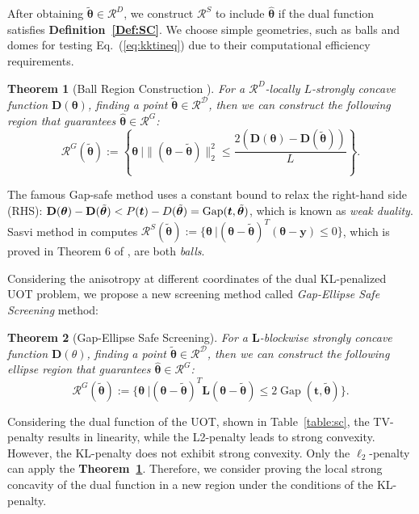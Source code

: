\documentclass[11pt]{article}
\newtheorem{thm}{Theorem}
\newcommand{\Gap}{\operatorname{Gap}}
\newcommand{\mat}[1]{\mathbf{#1}}
\renewcommand{\vec}[1]{\bm{#1}}
\begin{document}
After obtaining $\tilde{\vec{\theta}}\in\mathcal{R}^{D}$, we construct $\mathcal{R}^{S}$ to include $\hat{\vec{\theta}}$ if the dual function satisfies {\bf Definition~\ref{Def:SC}}. We choose simple geometries, such as balls and domes for testing Eq.~(\ref{eq:kktineq}) due to their computational efficiency requirements.
\label{Sec:SC}
\begin{thm}[Ball Region Construction \cite{Yamada_NIPS_2021}]
\label{Thm:Gap_all}
For a $\mathcal{R}^{D}$-locally $L$-strongly concave function $\mat D(\vec\theta)$, finding a point $\tilde{\vec\theta} \in \mathcal{R^{D}}$, then we can construct the following region that guarantees $\hat{\vec\theta} \in\mathcal{R}^{G}$:
\begin{equation}
\mathcal{R}^{G}(\tilde{\vec\theta}) :=\left\{\vec\theta \ |\|(\vec\theta-\tilde{\vec\theta})\|_2^2 \leq \frac{2(\mat D(\vec \theta) - \mat D(\tilde{\vec\theta}))}{ L} \right\}.
\label{eq:gs}
\end{equation}
\end{thm}
The famous Gap-safe method \cite{JMLR:v18:16-577} uses a constant bound to relax the right-hand side (RHS): $\mat D(\vec \theta) - \mat D(\tilde{\vec\theta}) < \mat \mat P({\vec t}) - D(\tilde{\vec \theta}) = \Gap(\vec t, \tilde{\vec \theta})$, which is known as {\it weak duality}. Sasvi method in \cite[Theorem 8]{Yamada_NIPS_2021} computes $\mathcal{R}^{S}(\tilde{\vec\theta}) :=\{\vec\theta \ | (\vec\theta-\tilde{\vec\theta})^{T}(\vec\theta-\vec y)\leq 0\}$, which is proved in Theorem 6 of \cite{Yamada_NIPS_2021}, are both {\it balls}.

Considering the anisotropy at different coordinates of the dual KL-penalized UOT problem, we propose a new screening method called {\it Gap-Ellipse Safe Screening} method:
\begin{thm}[Gap-Ellipse Safe Screening]
\label{Thm:Gap_ellipse}
For a $\mat L$-blockwise strongly concave function $\mat D(\theta)$, finding a point $\tilde{\vec\theta} \in \mathcal{R^{D}}$, then we can construct the following ellipse region that guarantees $\hat{\vec\theta} \in\mathcal{R}^{G}$:
\begin{equation}
\mathcal{R}^{G}(\tilde{\vec\theta}) :=\{\vec\theta \ | (\vec\theta-\tilde{\vec\theta})^{T}\mat L(\vec\theta-\tilde{\vec\theta}) \leq 2\Gap(\vec t, \tilde{\vec \theta})\}.
\label{eq:ge}
\end{equation}
\end{thm}
Considering the dual function of the UOT, shown in Table~\ref{table:sc}, the TV-penalty results in linearity, while the L2-penalty leads to strong convexity. However, the KL-penalty does not exhibit strong convexity. Only the $\ell_2$-penalty can apply the {\bf Theorem~\ref{Thm:Gap_all}}. Therefore, we consider proving the local strong concavity of the dual function in a new region under the conditions of the KL-penalty.
\end{document}
